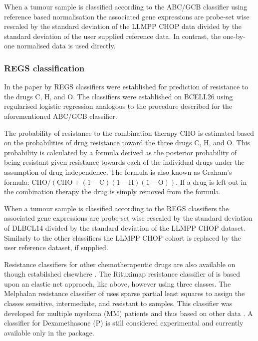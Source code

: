 \documentclass{article}
\begin{document}
When a tumour sample is classified according to the ABC/GCB classifier using reference based normalisation the associated gene expressions are probe-set wise rescaled by the standard deviation of the LLMPP CHOP data divided by the standard deviation of the user supplied reference data.
In contrast, the one-by-one normalised data is used directly.

\subsubsection{REGS classification}
In the paper by \citet{Falgreen2015} REGS classifiers were established for prediction of resistance to the drugs C, H, and O.
The classifiers were established on BCELL26 using regularised logistic regression analogous to the procedure described for the aforementioned ABC/GCB classifier.

The probability of resistance to the combination therapy CHO is estimated based on the probabilities of drug resistance toward the three drugs C, H, and O.
This probability is calculated by a formula derived as the posterior probability of being resistant given resistance towards each of the individual drugs under the assumption of drug independence.
The formula is also known as Graham's formula: $\mbox{CHO}/(\mbox{CHO}+(1-\mbox{C})(1-\mbox{H})(1-\mbox{O}))$.
If a drug is left out in the combination therapy the drug is simply removed from the formula.

When a tumour sample is classified according to the REGS classifiers the associated gene expressions are probe-set wise rescaled by the standard deviation of DLBCL14 divided by the standard deviation of the LLMPP CHOP dataset.
Similarly to the other classifiers the LLMPP CHOP cohort is replaced by the user reference dataset, if supplied.

Resistance classifiers for other chemotherapeutic drugs are also available on \hemaClass{} though estabilshed elsewhere \citep{Boegsted2011,Bogsted2013,Laursen2014}.
The Rituximap resistance classifier of \citet{Laursen2014} is based upon an elastic net appraoch, like above, however using three classes.
The Melphalan resistance classifier of \citet{Boegsted2011} uses sparse partial least squares to assign the classes sensitive, intermediate, and resistant to samples.
This classifier was developed for multiple myeloma (MM) patients and thus based on other data \citep{Boegsted2011}.
A classifier for Dexamethasone (P) is still considered experimental and currently available only in the package.
\end{document}

